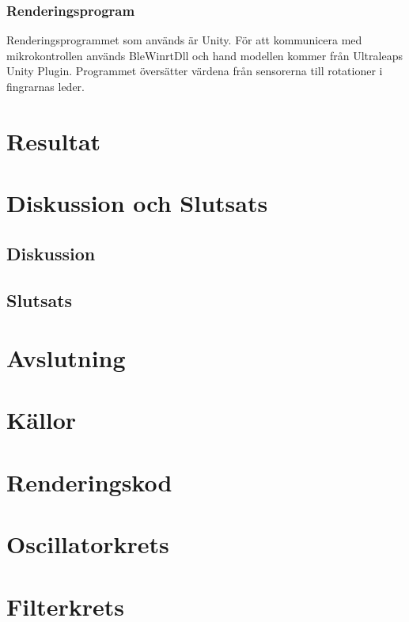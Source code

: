 \documentclass[a4paper]{article}
\begin{document}
\begin{sloppypar}
    \subsubsection{Renderingsprogram}
    Renderingsprogrammet som används är Unity.
    För att kommunicera med mikrokontrollen används BleWinrtDll och hand modellen kommer från Ultraleaps Unity Plugin.
    Programmet översätter värdena från sensorerna till rotationer i fingrarnas leder.





    \section{Resultat}
    \section{Diskussion och Slutsats}
    \subsection{Diskussion}

    \subsection{Slutsats}

    \section{Avslutning}




    \section{Källor}

    \appendices
    \titleformat{\section}[display]
    {\normalfont\Large\bfseries}{\appendixname\enspace\thesection}{.5em}{} %
    \section{Renderingskod}

    \section{Oscillatorkrets}

    \section{Filterkrets}


\end{sloppypar}
\printbibliography[heading=none]
\end{document}
